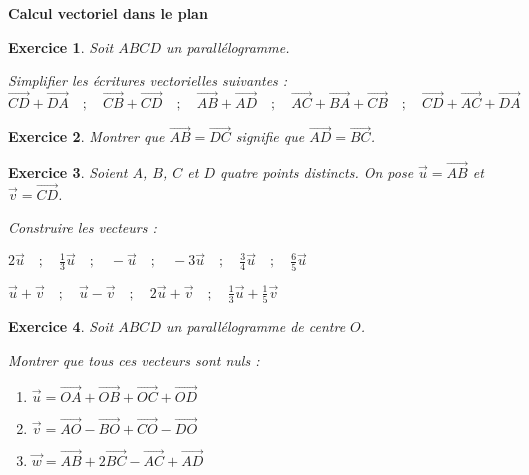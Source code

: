 \documentclass[12pt,a4paper]{article}
\theoremstyle{mystyle}
\newtheorem{exo}{Exercice}
\begin{document}
\pagestyle{fancy}
\fancyhf{} %
\fancyfoot[C]{\thepage} %


\begin{center}
    \textbf{\Large Calcul vectoriel dans le plan }
\end{center}
\begin{multicols*}{2}

\begin{exo}
   Soit $ABCD$ un parallélogramme.

   Simplifier les écritures vectorielles suivantes :
   $\overrightarrow{CD} + \overrightarrow{DA}\quad;\quad \overrightarrow{CB} + \overrightarrow{CD}\quad;\quad \overrightarrow{AB} + \overrightarrow{AD}\quad;\quad \overrightarrow{AC} + \overrightarrow{BA} + \overrightarrow{CB}\quad;\quad \overrightarrow{CD} + \overrightarrow{AC} + \overrightarrow{DA}$
\end{exo}

\begin{exo}
    Montrer que $\overrightarrow{AB} = \overrightarrow{DC}$ signifie que $\overrightarrow{AD} = \overrightarrow{BC}$.
\end{exo}

\begin{exo}
Soient $A$, $B$, $C$ et $D$ quatre points distincts.
On pose $\overrightarrow{u} = \overrightarrow{AB}$ et $\overrightarrow{v} = \overrightarrow{CD}$.

Construire les vecteurs :

$2\overrightarrow{u}\quad;\quad \displaystyle\frac{1}{3}\overrightarrow{u}\quad;\quad -\overrightarrow{u}\quad;\quad -3\overrightarrow{u}\quad;\quad\displaystyle\frac{3}{4}\overrightarrow{u}\quad;\quad\displaystyle\frac{6}{5}\overrightarrow{u}$

$\overrightarrow{u} + \overrightarrow{v}\quad;\quad \overrightarrow{u} - \overrightarrow{v}\quad;\quad 2\overrightarrow{u} + \overrightarrow{v}\quad;\quad\displaystyle\frac{1}{3}\overrightarrow{u} + \displaystyle\frac{1}{5}\overrightarrow{v}$
\end{exo}

\begin{exo}
Soit $ABCD$ un parallélogramme de centre $O$.

Montrer que tous ces vecteurs sont nuls :
\begin{enumerate}
    \item $\overrightarrow{u} = \overrightarrow{OA} + \overrightarrow{OB} + \overrightarrow{OC} + \overrightarrow{OD}$
    \item $\overrightarrow{v} = \overrightarrow{AO} - \overrightarrow{BO} + \overrightarrow{CO} - \overrightarrow{DO} $
    \item $\overrightarrow{w} = \overrightarrow{AB} + 2\overrightarrow{BC} -\overrightarrow{AC} + \overrightarrow{AD} $
\end{enumerate}
\end{exo}


\end{multicols*}
\end{document}
